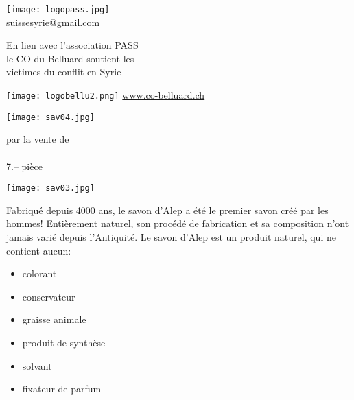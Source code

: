 \documentclass[frenchb,16pt,parskip=half-]{scrartcl}
\begin{document}
\begin{minipage}[b]{4cm}
	 \centering
    \texttt{[image: logopass.jpg]}\\
	 {\tiny \url{suissesyrie@gmail.com}}
\end{minipage}\hfill
\begin{minipage}[b]{11cm}\centering\Large
    En lien avec l'association PASS\\
     le CO du Belluard soutient les\\ victimes du conflit en Syrie%
\end{minipage}\hfill
\begin{minipage}[b]{4cm}
	 \centering
    \texttt{[image: logobellu2.png]}
	 {\tiny \url{www.co-belluard.ch}}
\end{minipage}%
\begin{center}
\end{center}\vspace{-2em}
\begin{minipage}[c]{5cm}
    \texttt{[image: sav04.jpg]}
\end{minipage}\hfill
\begin{minipage}[c]{8.5cm}\centering\huge
   par la vente de\\ \\ 7.-- pièce
\end{minipage}\hfill
\begin{minipage}[c]{5cm}
    \texttt{[image: sav03.jpg]}
\end{minipage}\vfill
Fabriqué depuis 4000 ans,
    le savon d'Alep a été le premier savon créé par les hommes! Entièrement naturel,
    son procédé de fabrication et sa composition n'ont jamais varié depuis l'Antiquité.
\vfill
Le savon d'Alep est un produit naturel, qui ne contient aucun:\\[-1.8em]
\begin{multicols}{3}
    \begin{itemize}
        \item colorant
        \item conservateur
        \item graisse animale
        \item produit de synthèse
        \item solvant
        \item fixateur de parfum
    \end{itemize}
\end{multicols}%
\end{document}
